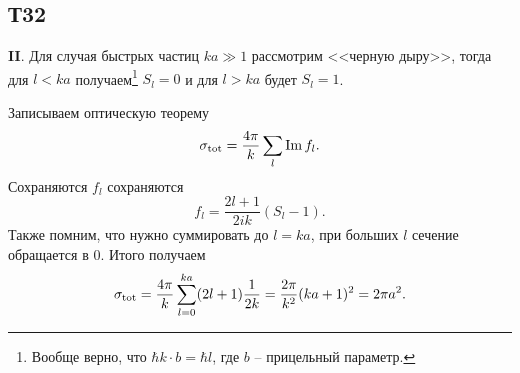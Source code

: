 

\subsection*{Т32}


\textbf{II}.
Для случая быстрых частиц $ka \gg 1$ рассмотрим <<черную дыру>>, тогда для $l < ka$ получаем\footnote{
	Вообще верно, что $\hbar k \cdot b = \hbar l$, где $b$ -- прицельный параметр.	
}  $S_l = 0$ и для $l > ka$  будет $S_l = 1$.

Записываем оптическую теорему
\begin{equation*}
	\sigma_{\textnormal{tot}} = \frac{4\pi}{k} \sum_l \mathop{\mathrm{Im}}\nolimits f_l.
\end{equation*}
Сохраняются $f_l$ сохраняются
\begin{equation*}
	f_l = \frac{2l+1}{2 ik } (S_l -1).
\end{equation*}
Также помним, что нужно суммировать до $l = ka$, при больших $l$ сечение обращается в $0$. Итого получаем
\begin{equation*}
	\sigma_{\textnormal{tot}} = \frac{4 \pi}{k} \sum_{l=0}^{ka} (2l+1) \frac{1}{2k} = \frac{2\pi}{k^2} (ka+1)^2 = 2 \pi a^2.
\end{equation*}


